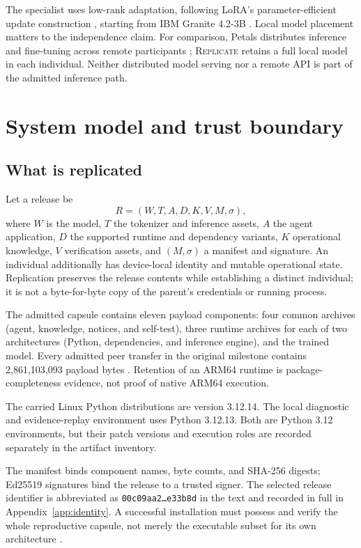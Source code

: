 \documentclass[11pt,letterpaper]{article}
\newcommand{\sys}{\textsc{Replicate}}
\begin{document}
The specialist uses low-rank adaptation, following LoRA's parameter-efficient
update construction \cite{lora}, starting from IBM Granite 4.2-3B
\cite{granite}. Local model placement matters to the independence claim.
For comparison, Petals distributes inference and fine-tuning across remote
participants \cite{petals}; \sys{} retains a full local model in each individual.
Neither distributed model serving nor a remote API is part of the admitted
inference path.

\section{System model and trust boundary}
\label{sec:design}

\subsection{What is replicated}

Let a release be
\[
R = (W,T,A,D,K,V,M,\sigma),
\]
where $W$ is the model, $T$ the tokenizer and inference assets, $A$ the agent
application, $D$ the supported runtime and dependency variants, $K$ operational
knowledge, $V$ verification assets, and $(M,\sigma)$ a manifest and signature.
An individual additionally has device-local identity and mutable operational
state. Replication preserves the release contents while establishing a distinct
individual; it is not a byte-for-byte copy of the parent's credentials or
running process.

The admitted capsule contains eleven payload components: four common archives
(agent, knowledge, notices, and self-test), three runtime archives for each of
two architectures (Python, dependencies, and inference engine), and the trained
model. Every admitted peer transfer in the original milestone contains
2,861,103,093 payload bytes
\cite{recovery,measurements}. Retention of an ARM64 runtime is package-completeness
evidence, not proof of native ARM64 execution.

The carried Linux Python distributions are version 3.12.14. The local
diagnostic and evidence-replay environment uses Python 3.12.13. Both are
Python 3.12 environments, but their patch versions and execution roles are
recorded separately in the artifact inventory.

The manifest binds component names, byte counts, and SHA-256 digests; Ed25519
signatures bind the release to a trusted signer. The selected release identifier
is abbreviated as \texttt{00c09aa2\ldots e33b8d} in the text and recorded in full
in Appendix~\ref{app:identity}. A successful installation must possess and verify
the whole reproductive capsule, not merely the executable subset for its own
architecture \cite{implementation,recovery}.
\end{document}
